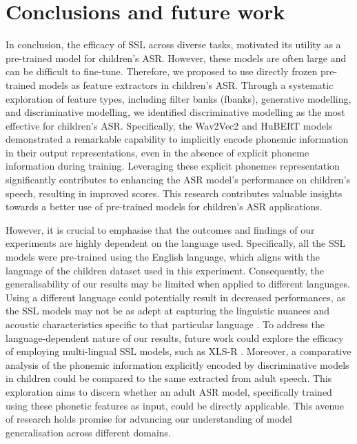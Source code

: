 \section{Conclusions and future work}
In conclusion, the efficacy of \ac{SSL} across diverse tasks, motivated its utility as a pre-trained model for children's \ac{ASR}. However, these models are often large and can be difficult to fine-tune. Therefore, we proposed to use directly frozen pre-trained models as feature extractors in children's \ac{ASR}. Through a systematic exploration of feature types, including filter banks (fbanks), generative modelling, and discriminative modelling, we identified discriminative modelling as the most effective for children's \ac{ASR}. Specifically, the Wav2Vec2 and HuBERT models demonstrated a remarkable capability to implicitly encode phonemic information in their output representations, even in the absence of explicit phoneme information during training. Leveraging these explicit phonemes representation significantly contributes to enhancing the \ac{ASR} model's performance on children's speech, resulting in improved scores. This research contributes valuable insights towards a better use of pre-trained models for children's \ac{ASR} applications.

However, it is crucial to emphasise that the outcomes and findings of our experiments are highly dependent on the language used. Specifically, all the \ac{SSL} models were pre-trained using the English language, which aligns with the language of the children dataset used in this experiment. Consequently, the generalisability of our results may be limited when applied to different languages. Using a different language could potentially result in decreased performances, as the \ac{SSL} models may not be as adept at capturing the linguistic nuances and acoustic characteristics specific to that particular language \cite{phdthesis}. To address the language-dependent nature of our results, future work could explore the efficacy of employing multi-lingual \ac{SSL} models, such as XLS-R \cite{babu2021xlsr}. Moreover, a comparative analysis of the phonemic information explicitly encoded by discriminative models in children could be compared to the same extracted from adult speech. This exploration aims to discern whether an adult \ac{ASR} model, specifically trained using these phonetic features as input, could be directly applicable.  This avenue of research holds promise for advancing our understanding of model generalisation across different domains.

